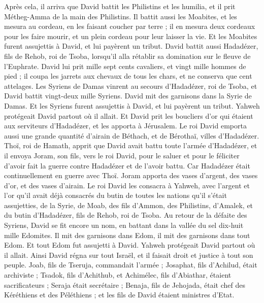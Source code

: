 \begin{multicols}{2}
\VerseOne{}Après cela, il arriva que David battit les Philistins et les humilia, et il prit Métheg-Amma de la main des Philistins.
Il battit aussi les Moabites, et les mesura au cordeau, en les faisant coucher par terre ; il en mesura deux cordeaux pour les faire mourir, et un plein cordeau pour leur laisser la vie. Et les Moabites furent assujettis à David, et lui payèrent un tribut.
David battit aussi Hadadézer, fils de Rehob, roi de Tsoba, lorsqu'il alla rétablir sa domination sur le fleuve de l'Euphrate.
David lui prit mille sept cents cavaliers, et vingt mille hommes de pied ; il coupa les jarrets aux chevaux de tous les chars, et ne conserva que cent attelages.
Les Syriens de Damas vinrent au secours d'Hadadézer, roi de Tsoba, et David battit vingt-deux mille Syriens.
David mit des garnisons dans la Syrie de Damas. Et les Syriens furent assujettis à David, et lui payèrent un tribut. Yahweh protégeait David partout où il allait.
Et David prit les boucliers d'or qui étaient aux serviteurs d'Hadadézer, et les apporta à Jérusalem.
Le roi David emporta aussi une grande quantité d'airain de Béthach, et de Bérothaï, villes d'Hadadézer.
Thoï, roi de Hamath, apprit que David avait battu toute l'armée d'Hadadézer,
et il envoya Joram, son fils, vers le roi David, pour le saluer et pour le féliciter d'avoir fait la guerre contre Hadadézer et de l'avoir battu. Car Hadadézer était continuellement en guerre avec Thoï. Joram apporta des vases d'argent, des vases d'or, et des vases d'airain.
Le roi David les consacra à Yahweh, avec l'argent et l'or qu'il avait déjà consacrés du butin de toutes les nations qu'il s'était assujetties,
de la Syrie, de Moab, des fils d'Ammon, des Philistins, d'Amalek, et du butin d'Hadadézer, fils de Rehob, roi de Tsoba.
Au retour de la défaite des Syriens, David se fit encore un nom, en battant dans la vallée du sel dix-huit mille Edomites.
Il mit des garnisons dans Edom, il mit des garnisons dans tout Edom. Et tout Edom fut assujetti à David. Yahweh protégeait David partout où il allait.
Ainsi David régna sur tout Israël, et il faisait droit et justice à tout son peuple.
Joab, fils de Tseruja, commandait l'armée ; Josaphat, fils d'Achilud, était archiviste ;
Tsadok, fils d'Achithub, et Achimélec, fils d'Abiathar, étaient sacrificateurs ; Seraja était secrétaire ;
Benaja, fils de Jehojada, était chef des Kéréthiens et des Péléthiens ; et les fils de David étaient ministres d'Etat.

\end{multicols}

